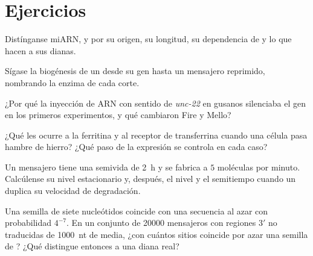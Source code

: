 \section{Ejercicios}

\begin{exercise}[$\star$]\label{exo:b3:rna-regulation:1}
Distínganse miARN,  y  por su origen, su longitud, su
dependencia de  y lo que hacen a sus dianas.
\end{exercise}

\begin{exercise}[$\star$]\label{exo:b3:rna-regulation:2}
Sígase la biogénesis de un  desde su gen hasta un mensajero
reprimido, nombrando la enzima de cada corte.
\end{exercise}

\begin{exercise}[$\star$]\label{exo:b3:rna-regulation:3}
¿Por qué la inyección de ARN con sentido de \emph{unc-22} en gusanos
silenciaba el gen en los primeros experimentos, y qué cambiaron Fire y
Mello?
\end{exercise}

\begin{exercise}[$\star$]\label{exo:b3:rna-regulation:4}
¿Qué les ocurre a la ferritina y al receptor de transferrina cuando una
célula pasa hambre de hierro? ¿Qué paso de la expresión se controla en
cada caso?
\end{exercise}

\begin{exercise}[$\star\star$]\label{exo:b3:rna-regulation:5}
Un mensajero tiene una semivida de \qty{2}{h} y se fabrica a $5$
moléculas por minuto. Calcúlense su nivel estacionario y, después, el
nivel y el semitiempo cuando un  duplica su velocidad de
degradación.
\end{exercise}

\begin{exercise}[$\star\star$]\label{exo:b3:rna-regulation:6}
Una semilla de siete nucleótidos coincide con una secuencia al azar con
probabilidad $4^{-7}$. En un conjunto de \num{20000} mensajeros con
regiones 3$'$ no traducidas de \qty{1000}{nt} de media, ¿con cuántos
sitios coincide por azar una semilla de ? ¿Qué distingue
entonces a una diana real?
\end{exercise}

